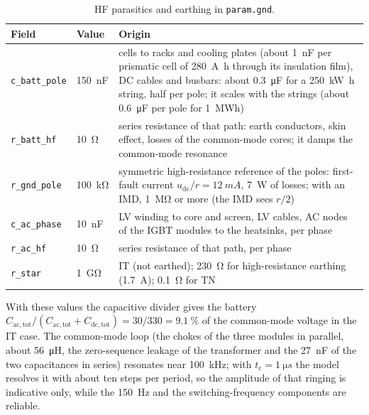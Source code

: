 \documentclass[11pt,a4paper]{scrartcl}
\newcommand{\ped}[1]{_{\mathrm{#1}}}
\newcommand{\code}[1]{\texttt{#1}}
\begin{document}
\begin{onehalfspace}
\begin{table}[H]
	\centering
	\captionsetup{width=0.9\textwidth, font=small}
	\caption{HF parasitics and earthing in \code{param.gnd}.}
	\label{tab:gnd}
	\footnotesize
	\begin{tabularx}{\textwidth}{@{} l l X @{}}
		\toprule
		\textbf{Field} & \textbf{Value} & \textbf{Origin} \\
		\midrule
		\code{c\_batt\_pole} & \SI{150}{nF} & cells to racks and cooling plates (about \SI{1}{nF} per prismatic cell of \SI{280}{\ampere\hour} through its insulation film), DC cables and busbars: about \SI{0.3}{\micro\farad} for a \SI{250}{\kilo\watt\hour} string, half per pole; it scales with the strings (about \SI{0.6}{\micro\farad} per pole for \SI{1}{MWh}) \\
		\code{r\_batt\_hf} & \SI{10}{\ohm} & series resistance of that path: earth conductors, skin effect, losses of the common-mode cores; it damps the common-mode resonance \\
		\code{r\_gnd\_pole} & \SI{100}{\kilo\ohm} & symmetric high-resistance reference of the poles: first-fault current $u\ped{dc}/r = \SI{12}{mA}$, \SI{7}{W} of losses; with an IMD, \SI{1}{\mega\ohm} or more (the IMD sees $r/2$) \\
		\code{c\_ac\_phase} & \SI{10}{nF} & LV winding to core and screen, LV cables, AC nodes of the IGBT modules to the heatsinks, per phase \\
		\code{r\_ac\_hf} & \SI{10}{\ohm} & series resistance of that path, per phase \\
		\code{r\_star} & \SI{1}{\giga\ohm} & IT (not earthed); \SI{230}{\ohm} for high-resistance earthing (\SI{1.7}{A}); \SI{0.1}{\ohm} for TN \\
		\bottomrule
	\end{tabularx}
\end{table}

With these values the capacitive divider gives the battery $C\ped{ac,tot}/(C\ped{ac,tot} + C\ped{dc,tot}) = 30/330 = \SI{9.1}{\percent}$ of the common-mode voltage in the IT case. The common-mode loop (the chokes of the three modules in parallel, about \SI{56}{\micro\henry}, the zero-sequence leakage of the transformer and the \SI{27}{nF} of the two capacitances in series) resonates near \SI{100}{kHz}; with $t\ped{c} = \SI{1}{\micro s}$ the model resolves it with about ten steps per period, so the amplitude of that ringing is indicative only, while the \SI{150}{Hz} and the switching-frequency components are reliable.


\end{onehalfspace}
\end{document}

